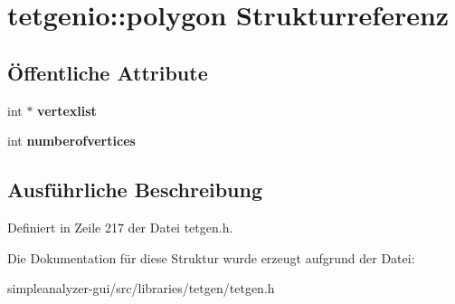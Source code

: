 \hypertarget{structtetgenio_1_1polygon}{\section{tetgenio\-:\-:polygon Strukturreferenz}
\label{structtetgenio_1_1polygon}
}
\subsection*{Öffentliche Attribute}
\begin{DoxyCompactItemize}
\item 
\hypertarget{structtetgenio_1_1polygon_a3cc2d3756bc093db5c252dd8f42a5001}{int $\ast$ {\bfseries vertexlist}}\label{structtetgenio_1_1polygon_a3cc2d3756bc093db5c252dd8f42a5001}

\item 
\hypertarget{structtetgenio_1_1polygon_a019f9c62f145cf7d85227f401fcdba38}{int {\bfseries numberofvertices}}\label{structtetgenio_1_1polygon_a019f9c62f145cf7d85227f401fcdba38}

\end{DoxyCompactItemize}


\subsection{Ausführliche Beschreibung}


Definiert in Zeile 217 der Datei tetgen.\-h.



Die Dokumentation für diese Struktur wurde erzeugt aufgrund der Datei\-:\begin{DoxyCompactItemize}
\item 
simpleanalyzer-\/gui/src/libraries/tetgen/tetgen.\-h\end{DoxyCompactItemize}
